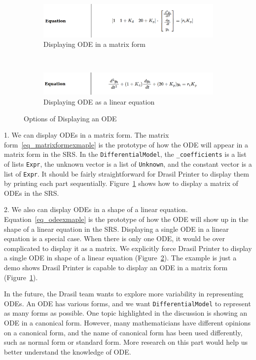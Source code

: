 \begin{figure}[ht]
	\centering
	\begin{subfigure}[t]{\textwidth}
		\centering
		
\includegraphics[width=1\textwidth]{figures/ODEInMatrix.png}
		\caption{Displaying ODE in a matrix form}
		\label{fig_multienv_odematrix}
	\end{subfigure}
	~
	\begin{subfigure}[t]{\textwidth}
		\centering
	
\includegraphics[width=1\textwidth]{figures/ODEInLinearEq.png}
		\caption{Displaying ODE as a linear equation}
		\label{fig_multienv_odelinear}
	\end{subfigure}
	
	\caption{Options of Displaying an ODE}
	\label{fig_multienv}
\end{figure}

1. We can display ODEs in a matrix form. The matrix form~\ref{eq_matrixformexmaple} is the prototype of how the ODE will appear in a matrix form in the SRS. In the \verb|DifferentialModel|, the \verb|_coefficients| is a list of lists \verb|Expr|, the unknown vector is a list of \verb|Unknown|, and the constant vector is a list of \verb|Expr|. It should be fairly straightforward for Drasil Printer to display them by printing each part sequentially. Figure~\ref{fig_multienv_odematrix} shows how to display a matrix of ODEs in the SRS. 

2. We also can display ODEs in a shape of a linear equation. Equation~\ref{eq_odeexmaple} is the prototype of how the ODE will show up in the shape of a linear equation in the SRS. Displaying a single ODE in a linear equation is a special case. When there is only one ODE, it would be over complicated to display it as a matrix. We explicitly force Drasil Printer to display a single ODE in shape of a linear equation (Figure~\ref{fig_multienv_odelinear}). The example is just a demo shows Drasil Printer is capable to display an ODE in a matrix form (Figure~\ref{fig_multienv_odematrix}).

In the future, the Drasil team wants to explore more variability in representing ODEs. An ODE has various forms, and we want \verb|DifferentialModel| to represent as many forms as possible. One topic highlighted in the discussion is showing an ODE in a canonical form. However, many mathematicians have different opinions on a canonical form, and the name of canonical form has been used differently, such as normal form or standard form. More research on this part would help us better understand the knowledge of ODE.
